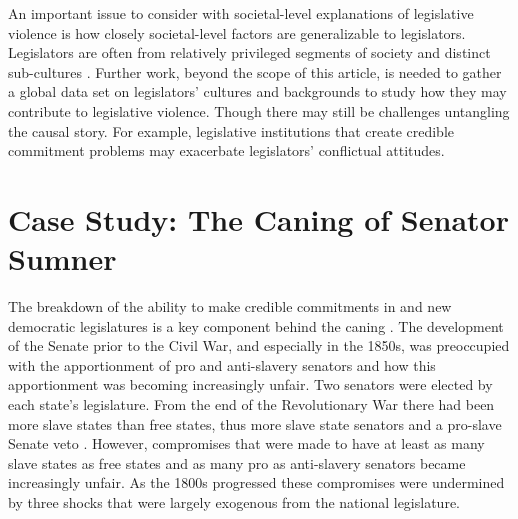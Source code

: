 \documentclass[a4paper]{article}\usepackage[]{graphicx}\usepackage[]{color}
\begin{document}
An important issue to consider with societal-level explanations of legislative violence is how closely societal-level factors are generalizable to legislators. Legislators are often from relatively privileged segments of society and distinct sub-cultures \citep[408]{Spary2013}. Further work, beyond the scope of this article, is needed to gather a global data set on legislators' cultures and backgrounds to study how they may contribute to legislative violence. Though there may still be challenges untangling the causal story. For example, legislative institutions that create credible commitment problems may exacerbate legislators' conflictual attitudes.

\section*{Case Study: The Caning of Senator Sumner}


The breakdown of the ability to make credible commitments in  and new democratic legislatures is a key component behind the caning . The development of the Senate prior to the Civil War, and especially in the 1850s, was preoccupied with the apportionment of pro and anti-slavery senators and how this apportionment was becoming increasingly unfair. Two senators were elected by each state's legislature. From the end of the Revolutionary War there had been more slave states than free states, thus more slave state senators and a pro-slave Senate veto \cite[151]{Weingast1998}. However, compromises that were made to have at least as many slave states as free states and as many pro as anti-slavery senators became increasingly unfair. As the 1800s progressed these compromises were undermined by three shocks that were largely exogenous from the national legislature.
\end{document}
